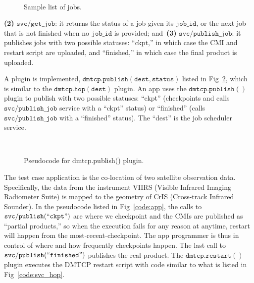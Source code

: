 \documentclass[conference]{IEEEtran}
\begin{document}
\begin{figure}[!ht]
\begin{center}
\begin{center}
\mbox{}\\[0.3em]
\end{center}
\hspace{\fill}%
\caption{Sample list of jobs.}
\label{code:jobs}
\end{center}
\end{figure}

\textbf{(2)} $\mathtt{svc/get\_job}$: it returns the status of a job given its $\mathtt{job\_id}$, or the next job that is not finished when no $\mathtt{job\_id}$ is provided; and~\textbf{(3)} $\mathtt{svc/publish\_job}$: it publishes jobs with two possible statuses: ``ckpt,'' in which case the CMI and restart script are uploaded, and ``finished,'' in which case the final product is uploaded.

A plugin is implemented, $\mathtt{dmtcp.publish(dest, status)}$ listed in Fig~\ref{code:dmtcp-publish}, which is similar to the $\mathtt{dmtcp.hop(dest)}$ plugin. An app uses the $\mathtt{dmtcp.publish()}$ plugin to publish with two possible statuses: ``ckpt'' (checkpoints and calls $\mathtt{svc/publish\_job}$ service with a ``ckpt'' status) or ``finished'' (calls $\mathtt{svc/publish\_job}$ with a ``finished'' status). The ``dest'' is the job scheduler service.


\begin{figure}[!ht]
\begin{center}
\begin{center}
\mbox{}\\[0.3em]
\end{center}
\hspace{\fill}%
\caption{Pseudocode for dmtcp.publish() plugin.}
\label{code:dmtcp-publish}
\end{center}
\end{figure}


The test case application is the co-location of two satellite observation data. Specifically, the data from the instrument VIIRS (Visible Infrared Imaging Radiometer Suite) is mapped to the geometry of CrIS (Cross-track Infrared Sounder). In the pseudocode listed in Fig~\ref{code:app}, the calls to $\mathtt{svc/publish(``ckpt")}$ are where we checkpoint and the CMIs are published as ``partial products,'' so when the execution fails for any reason at anytime, restart will happen from the most-recent-checkpoint. The app programmer is thus in control of where and how frequently checkpoints happen. The last call to $\mathtt{svc/publish(``finished")}$ publishes the real product. The $\mathtt{dmtcp.restart()}$ plugin executes the DMTCP restart script with code similar to what is listed in Fig~\ref{code:svc_hop}.
\end{document}
